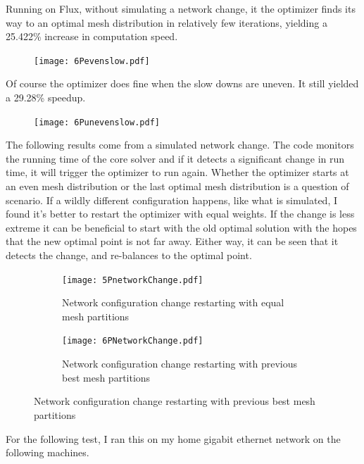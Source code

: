 \documentclass[12pt,parskip=full]{article}
\numberwithin{subsection}{section}
\begin{document}
		Running on Flux, without simulating a network change, it the optimizer finds its way to an optimal mesh distribution in relatively few iterations,
		yielding a 25.422\% increase in computation speed.

		\begin{figure}[H]
			\centering
			\texttt{[image: 6Pevenslow.pdf]}
		\end{figure}

		Of course the optimizer does fine when the slow downs are uneven. It still yielded a 29.28\% speedup.
		\begin{figure}[H]
			\centering
			\texttt{[image: 6Punevenslow.pdf]}
		\end{figure}

		The following results come from a simulated network change. The code monitors the running time of the core solver and if it detects a significant
		change in run time, it will trigger the optimizer to run again. Whether the optimizer starts at an even mesh distribution or the last optimal mesh
		distribution is a question of scenario. If a wildly different configuration happens, like what is simulated, I found it's better to restart
		the optimizer with equal weights. If the change is less extreme it can be beneficial to start with the old optimal solution with the hopes
		that the new optimal point is not far away. Either way, it can be seen that it detects the change, and re-balances to the optimal point.
		\begin{figure}[H]
			\centering
			\begin{subfigure}[H]{0.9\textwidth}
				\texttt{[image: 5PnetworkChange.pdf]}
				\caption{Network configuration change restarting with equal mesh partitions}
			\end{subfigure}
			\begin{subfigure}[H]{0.9\textwidth}
				\texttt{[image: 6PNetworkChange.pdf]}
				\caption{Network configuration change restarting with previous best mesh partitions}
			\end{subfigure}
		\end{figure}

		For the following test, I ran this on my home gigabit ethernet network on the following machines.
\end{document}

